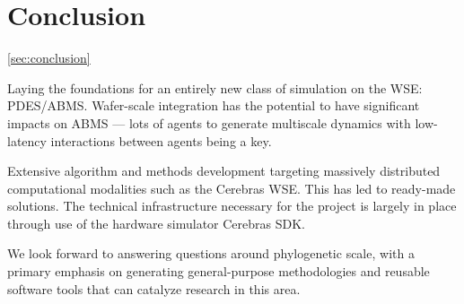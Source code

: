 \section{Conclusion} \ref{sec:conclusion}

Laying the foundations for an entirely new class of simulation on the WSE: PDES/ABMS.
Wafer-scale integration has the potential to have significant impacts on ABMS --- lots of agents to generate multiscale dynamics with low-latency interactions between agents being a key.

Extensive algorithm and methods development targeting massively distributed computational modalities such as the Cerebras WSE.
This has led to ready-made solutions.
The technical infrastructure necessary for the project is largely in place through use of the hardware simulator Cerebras SDK.

We look forward to answering questions around phylogenetic scale, with a primary emphasis on generating general-purpose methodologies and reusable software tools that can catalyze research in this area.